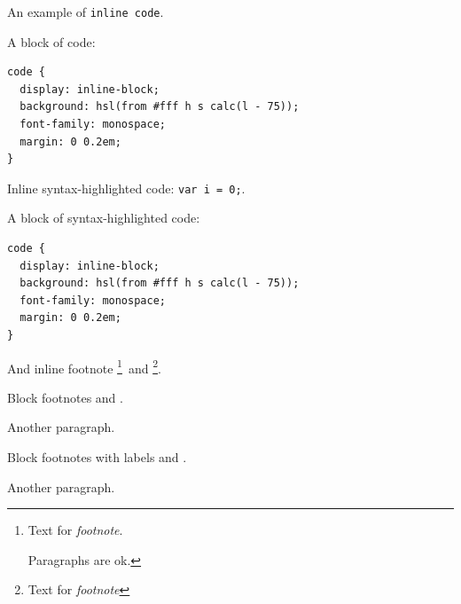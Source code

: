 \documentclass{article}
\theoremstyle{definition}
\theoremstyle{remark}
\begin{document}
An example of \verb|inline code|.

A block of code:

\begin{verbatim}
code {
  display: inline-block;
  background: hsl(from #fff h s calc(l - 75));
  font-family: monospace;
  margin: 0 0.2em;
}
\end{verbatim}

Inline syntax-highlighted code: \texttt{var i = 0;}.

A block of syntax-highlighted code:

\begin{verbatim}
code {
  display: inline-block;
  background: hsl(from #fff h s calc(l - 75));
  font-family: monospace;
  margin: 0 0.2em;
}
\end{verbatim}

And inline footnote \footnote{
  Text for \emph{footnote}.

  Paragraphs are ok.
}~and \footnote{Text for \emph{footnote}}.

Block footnotes \footnotemark[3] and \footnotemark[4].

Another paragraph.



Block footnotes with labels \footnotemark[alpha] and \footnotemark[bravo].

Another paragraph.


\end{document}
